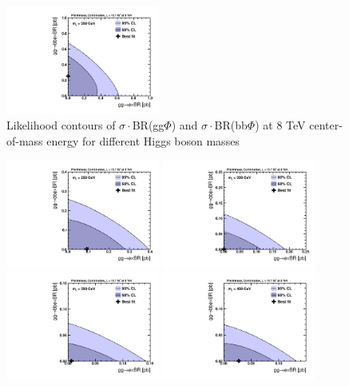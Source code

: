 \begin{figure}[!h]
\begin{center}
 \includegraphics[width=0.45\textwidth]{MSSM/PLOTS/cmb-ggH-bbH-scan-GGH-BBH-200.pdf}
 \caption{Likelihood contours of $\sigma\cdot$BR(gg$\Phi$) and $\sigma\cdot$BR(bb$\Phi$) at 8 TeV center-of-mass energy for different Higgs boson masses}
  \label{fig:contour2}\end{center}\end{figure}


\begin{figure}[!h]\begin{center}
 \includegraphics[width=0.45\textwidth]{MSSM/PLOTS/cmb-ggH-bbH-scan-GGH-BBH-250.pdf}
 \includegraphics[width=0.45\textwidth]{MSSM/PLOTS/cmb-ggH-bbH-scan-GGH-BBH-300.pdf}
 \includegraphics[width=0.45\textwidth]{MSSM/PLOTS/cmb-ggH-bbH-scan-GGH-BBH-350.pdf}
 \includegraphics[width=0.45\textwidth]{MSSM/PLOTS/cmb-ggH-bbH-scan-GGH-BBH-400.pdf}

\end{center}
\end{figure}
